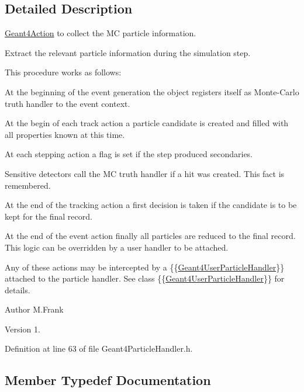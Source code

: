 \subsection{Detailed Description}
\hyperlink{class_d_d4hep_1_1_simulation_1_1_geant4_action}{Geant4\+Action} to collect the MC particle information. 

Extract the relevant particle information during the simulation step.

This procedure works as follows\+:
\begin{DoxyItemize}
\item At the beginning of the event generation the object registers itself as Monte-\/\+Carlo truth handler to the event context.
\item At the begin of each track action a particle candidate is created and filled with all properties known at this time.
\item At each stepping action a flag is set if the step produced secondaries.
\item Sensitive detectors call the MC truth handler if a hit was created. This fact is remembered.
\item At the end of the tracking action a first decision is taken if the candidate is to be kept for the final record.
\item At the end of the event action finally all particles are reduced to the final record. This logic can be overridden by a user handler to be attached.
\end{DoxyItemize}Any of these actions may be intercepted by a \{\{\hyperlink{class_d_d4hep_1_1_simulation_1_1_geant4_user_particle_handler}{Geant4\+User\+Particle\+Handler}\}\} attached to the particle handler. See class \{\{\hyperlink{class_d_d4hep_1_1_simulation_1_1_geant4_user_particle_handler}{Geant4\+User\+Particle\+Handler}\}\} for details.

\begin{DoxyAuthor}{Author}
M.\+Frank 
\end{DoxyAuthor}
\begin{DoxyVersion}{Version}
1. 
\end{DoxyVersion}


Definition at line 63 of file Geant4\+Particle\+Handler.\+h.



\subsection{Member Typedef Documentation}
\hypertarget{class_d_d4hep_1_1_simulation_1_1_geant4_particle_handler_a69214f487c50f6fd550571f37e715117}{}\label{class_d_d4hep_1_1_simulation_1_1_geant4_particle_handler_a69214f487c50f6fd550571f37e715117} 
